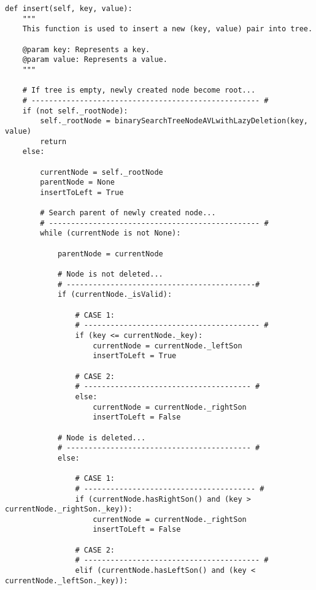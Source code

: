 \documentclass[10pt,a4paper,titlepage]{article}
\begin{document}
\begin{lstlisting}[frame=lines]
def insert(self, key, value):
    """
    This function is used to insert a new (key, value) pair into tree.
        
    @param key: Represents a key.      
    @param value: Represents a value. 
    """
        
    # If tree is empty, newly created node become root...
    # ---------------------------------------------------- #
    if (not self._rootNode):
        self._rootNode = binarySearchTreeNodeAVLwithLazyDeletion(key, value)
        return
    else:
            
        currentNode = self._rootNode
        parentNode = None
        insertToLeft = True
            
        # Search parent of newly created node...
        # ------------------------------------------------ #
        while (currentNode is not None):
                
            parentNode = currentNode
                
            # Node is not deleted...
            # -------------------------------------------#
            if (currentNode._isValid):
                    
                # CASE 1:
                # ---------------------------------------- #
                if (key <= currentNode._key):                
                    currentNode = currentNode._leftSon
                    insertToLeft = True
                        
                # CASE 2:
                # -------------------------------------- #
                else:
                    currentNode = currentNode._rightSon
                    insertToLeft = False
                        
            # Node is deleted...
            # ------------------------------------------ #      
            else:   
                    
                # CASE 1:
                # --------------------------------------- #
                if (currentNode.hasRightSon() and (key > currentNode._rightSon._key)):     
                    currentNode = currentNode._rightSon
                    insertToLeft = False
                        
                # CASE 2:
                # ---------------------------------------- #
                elif (currentNode.hasLeftSon() and (key < currentNode._leftSon._key)):
                        

\end{lstlisting}
\end{document}
